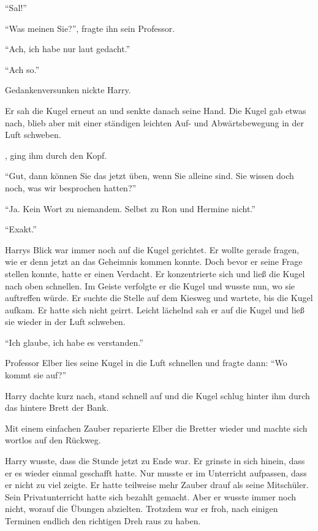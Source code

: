
\enquote{Sal!}

\enquote{Was meinen Sie?}, fragte ihn sein Professor.

\enquote{Ach, ich habe nur laut gedacht.}

\enquote{Ach so.}




 Gedankenversunken nickte Harry.

Er sah die Kugel erneut an und senkte danach seine Hand. Die Kugel gab etwas nach, blieb aber mit einer ständigen leichten Auf- und Abwärtsbewegung in der Luft schweben.

, ging ihm durch den Kopf.

\enquote{Gut, dann können Sie das jetzt üben, wenn Sie alleine sind. Sie wissen doch noch, was wir besprochen hatten?}

\enquote{Ja. Kein Wort zu niemandem. Selbst zu Ron und Hermine nicht.}

\enquote{Exakt.}

Harrys Blick war immer noch auf die Kugel gerichtet. Er wollte gerade fragen, wie er denn jetzt an das Geheimnis kommen konnte. Doch bevor er seine Frage stellen konnte, hatte er einen Verdacht. Er konzentrierte sich und ließ die Kugel nach oben schnellen. Im Geiste verfolgte er die Kugel und wusste nun, wo sie auftreffen würde. Er suchte die Stelle auf dem Kiesweg und wartete, bis die Kugel aufkam. Er hatte sich nicht geirrt. Leicht lächelnd sah er auf die Kugel und ließ sie wieder in der Luft schweben.

\enquote{Ich glaube, ich habe es verstanden.}

Professor Elber lies seine Kugel in die Luft schnellen und fragte dann: \enquote{Wo kommt sie auf?}

Harry dachte kurz nach, stand schnell auf und die Kugel schlug hinter ihm durch das hintere Brett der Bank.

Mit einem einfachen Zauber reparierte Elber die Bretter wieder und machte sich wortlos auf den Rückweg.

Harry wusste, dass die Stunde jetzt zu Ende war. Er grinste in sich hinein, dass er es wieder einmal geschafft hatte. Nur musste er im Unterricht aufpassen, dass er nicht zu viel zeigte. Er hatte teilweise mehr Zauber drauf als seine Mitschüler. Sein Privatunterricht hatte sich bezahlt gemacht. Aber er wusste immer noch nicht, worauf die Übungen abzielten. Trotzdem war er froh, nach einigen Terminen endlich den richtigen Dreh raus zu haben.

